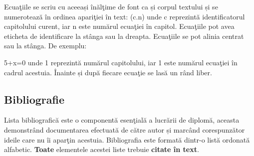 	Ecuaţiile se scriu cu aceeași înălţime de font ca și corpul textului și se numerotează în ordinea apariţiei în text: (c.n) unde c reprezintă identificatorul capitolului curent, iar n este numărul ecuaţiei în capitol. Ecuaţiile pot avea eticheta de identificare la stânga sau la dreapta. Ecuaţiile se pot alinia centrat sau la stânga. De exemplu:

\be
\label{eq:test}
5+x=0
\ee
unde 1 reprezintă numărul capitolului, iar 1 este numărul ecuaţiei în cadrul acestuia. Înainte și după fiecare ecuaţie se lasă un rând liber.


\subsection{Bibliografie}

	Lista bibliografică este o componentă esenţială a lucrării de diplomă, aceasta demonstrând documentarea efectuată de către autor și marcând corespunzător ideile care nu îi aparţin acestuia. Bibliografia este formată dintr-o listă ordonată alfabetic. \textbf{Toate} elementele acestei liste trebuie \textbf{citate în text}.


